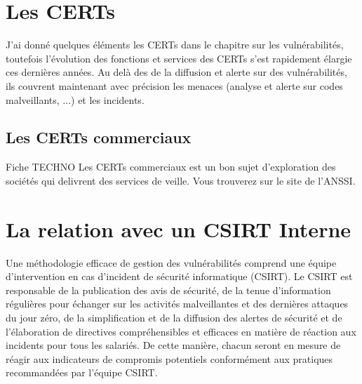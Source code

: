 
\section{Les CERTs}

J'ai donné quelques éléments les CERTs dans le chapitre sur les vulnérabilités, toutefois l'évolution des fonctions et services des CERTs s'est rapidement élargie ces dernières années. Au delà des de la diffusion et alerte sur des vulnérabilités, ils couvrent maintenant avec précision les menaces (analyse et alerte sur codes malveillants, ...) et les incidents. 

\subsection{Les CERTs commerciaux}

\begin{warningbox}{Fiche TECHNO}
	Les CERTs commerciaux est un bon sujet d'exploration des sociétés qui delivrent des services de veille. Vous trouverez 
	 sur le site de l'ANSSI.
\end{warningbox}

\section{La relation avec un CSIRT Interne }

	Une méthodologie efficace de gestion des vulnérabilités comprend une équipe d’intervention en cas d’incident de sécurité informatique (CSIRT). Le CSIRT est responsable de la publication des avis de sécurité, de la tenue d'information régulières pour échanger sur les activités malveillantes et des dernières attaques du jour zéro, de la simplification et de la diffusion des alertes de sécurité et de l’élaboration de directives compréhensibles et efficaces en matière de réaction aux incidents pour tous les salariés. De cette manière, chacun seront en mesure de réagir aux indicateurs de compromis potentiels conformément aux pratiques recommandées par l'équipe CSIRT.